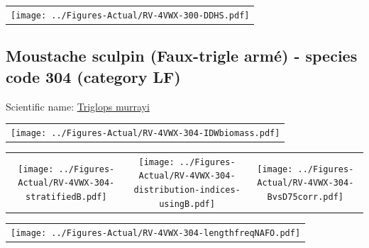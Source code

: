 \documentclass[12pt]{article}\usepackage[]{graphicx}\usepackage[]{color}
\begin{document}
\vspace{1cm}
\begin{minipage}{1.0\textwidth}
 \begin{tabular}{c}
\texttt{[image: ../Figures-Actual/RV-4VWX-300-DDHS.pdf]} \\ 
\end{tabular} 
\end{minipage}
\clearpage

\renewcommand\thefigure{\thesubsection\Alph{figure}}

\setcounter{figure}{0}

\hypertarget{sec:304}{%
\subsection{Moustache sculpin (Faux-trigle armé) - species code 304 (category LF)}\label{sec:304}}

  


Scientific name: \href{http://www.marinespecies.org/aphia.php?p=taxdetails\&id=127205}{Triglops murrayi} \newline
\begin{minipage}{1.0\textwidth}
 \begin{tabular}{c}
\texttt{[image: ../Figures-Actual/RV-4VWX-304-IDWbiomass.pdf]} \\ 
\end{tabular} 
\end{minipage}
\newline

\vspace{1cm}
\begin{minipage}{1.0\textwidth}
 \begin{tabular}{ccc}
\texttt{[image: ../Figures-Actual/RV-4VWX-304-stratifiedB.pdf]} & 
\texttt{[image: ../Figures-Actual/RV-4VWX-304-distribution-indices-usingB.pdf]} & 
\texttt{[image: ../Figures-Actual/RV-4VWX-304-BvsD75corr.pdf]} \\ 
\end{tabular} 
\end{minipage}
\clearpage
\begin{minipage}{1.0\textwidth}
 \begin{tabular}{c}
\texttt{[image: ../Figures-Actual/RV-4VWX-304-lengthfreqNAFO.pdf]} \\ 
\end{tabular} 
\end{minipage}
\newline
\end{document}
